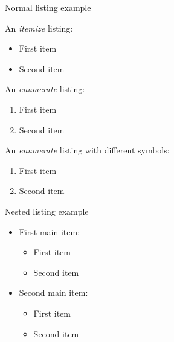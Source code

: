 \begin{frame}{Normal listing example}

  An \textit{itemize} listing:

  \begin{itemize}
    \item First item
    \item Second item
  \end{itemize}

  \vspace{0.6cm}

  An \textit{enumerate} listing:

  \begin{enumerate}
    \item First item
    \item Second item
  \end{enumerate}

  \vspace{0.6cm}

  An \textit{enumerate} listing with different symbols:

  \begin{enumerate}[1)]
    \item First item
    \item Second item
  \end{enumerate}

\end{frame}

\begin{frame}{Nested listing example}

  \begin{itemize}

    \item First main item:

    \begin{itemize}
      \item First item
      \item Second item
    \end{itemize}
    
    \vspace{0.6cm}

    \item Second main item:

    \begin{itemize}
      \item First item
      \item Second item
    \end{itemize}

  \end{itemize}

\end{frame}